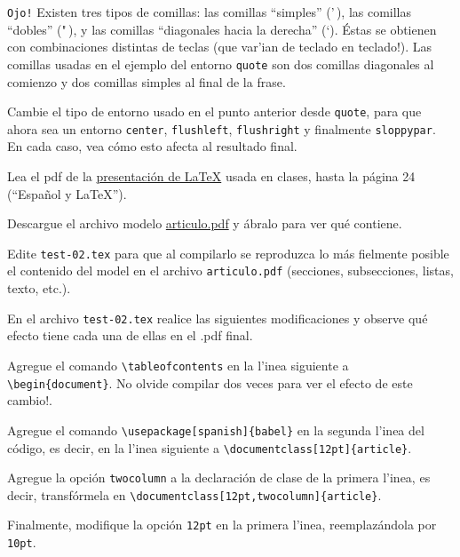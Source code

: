 \documentclass[11pt]{exam}
\begin{document}
\begin{questions}
\texttt{Ojo!} Existen tres tipos de comillas: 	las comillas ``simples'' ('\,), las comillas ``dobles'' ("\,), y las comillas ``diagonales hacia la derecha'' (`). Éstas se obtienen con combinaciones distintas de teclas (que var'ian de teclado en teclado!). Las comillas usadas en el ejemplo del entorno \texttt{quote} son dos comillas diagonales al comienzo y dos comillas simples al final de la frase.


\item Cambie el tipo de entorno usado en el punto anterior desde \texttt{quote}, para que ahora sea un entorno \texttt{center}, \texttt{flushleft}, \texttt{flushright} y finalmente \texttt{sloppypar}. En cada caso, vea cómo esto afecta al resultado final.

\item Lea el pdf de la \href{https://udec.instructure.com/courses/40179/pages/latex-pdf-presentacion?module_item_id=1465499}{presentación de \LaTeX} usada en clases, hasta la página 24 (``Espa\~nol y \LaTeX'').

\item Descargue el archivo modelo \href{https://github.com/gfrubi/CC/blob/master/guias/03/articulo.pdf}{articulo.pdf} y ábralo para ver qué contiene. 


\item Edite \texttt{test-02.tex} para que al compilarlo se reproduzca lo más fielmente posible el contenido del model en el archivo \texttt{articulo.pdf} (secciones, subsecciones, listas, texto, etc.).

\item En el archivo \texttt{test-02.tex} realice las siguientes modificaciones y observe qué efecto tiene cada una de ellas en el .pdf final.
\begin{parts}
\item Agregue el comando \verb|\tableofcontents| en la l'inea siguiente a \verb|\begin{document}|. No olvide compilar dos veces para ver el efecto de este cambio!.
\item Agregue el comando \verb|\usepackage[spanish]{babel}| en la segunda l'inea del código, es decir, en la l'inea siguiente a \verb|\documentclass[12pt]{article}|.
\item Agregue la opción \verb|twocolumn| a la declaración de clase de la primera l'inea, es decir, transfórmela en \verb|\documentclass[12pt,twocolumn]{article}|.
\item Finalmente, modifique la opción \verb|12pt| en la primera l'inea, reemplazándola por \verb|10pt|.
\end{parts}


\end{questions}
\end{document}
